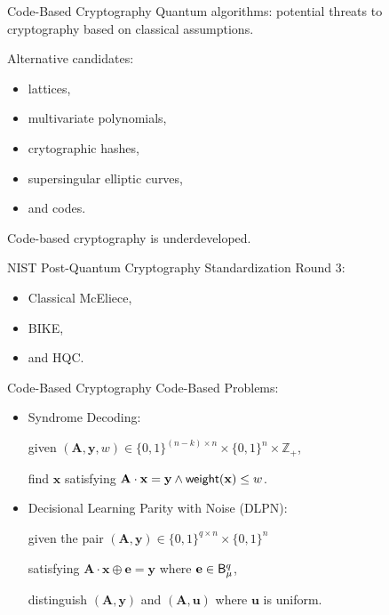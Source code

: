 \begin{frame}{Code-Based Cryptography}
	Quantum algorithms: potential threats to cryptography based on classical assumptions.\pause
	
	Alternative candidates: \pause
	\begin{itemize}
		\item lattices, \pause
		\item multivariate polynomials, \pause
		\item crytographic hashes, \pause
		\item supersingular elliptic curves, \pause
		\item and codes.\pause
	\end{itemize}

	Code-based cryptography is underdeveloped.\pause
	
	NIST Post-Quantum Cryptography Standardization Round 3: \pause
	\begin{itemize}
		\item Classical McEliece, \pause
		\item BIKE,\pause
		\item and HQC.
	\end{itemize}
\end{frame}

\begin{frame}{Code-Based Cryptography}
	Code-Based Problems:\pause
	\begin{itemize}
		\item Syndrome Decoding: \pause
		
		given $(\mathbf{A}, \mathbf{y}, w) \in \{0,1\}^{(n - k)\times n}\times \{0,1\}^n\times \mathbb{Z}_+$,\pause
		
		find $\mathbf{x}$ satisfying $\mathbf{A}\cdot\mathbf{x} = \mathbf{y} \wedge \mathsf{weight}(\mathbf{x}) \leq w$.\pause
		
		\item Decisional Learning Parity with Noise (DLPN):\pause
		
		given the pair $(\mathbf{A}, \mathbf{y}) \in \{0,1\}^{q\times n}\times \{0,1\}^n$\pause
		
		satisfying $\mathbf{A}\cdot\mathbf{x}\oplus \mathbf{e} = \mathbf{y}$ where $\mathbf{e} \in \mathsf{B}_\mu^q$,\pause
		
		distinguish $(\mathbf{A}, \mathbf{y})$ and $(\mathbf{A}, \mathbf{u})$ where $\mathbf{u}$ is uniform.
	\end{itemize}
\end{frame}